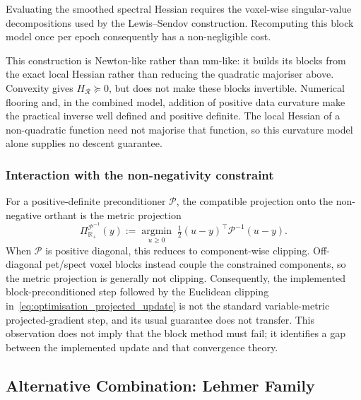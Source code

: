 Evaluating the smoothed spectral Hessian requires the voxel-wise singular-value decompositions used by the Lewis--Sendov construction. Recomputing this block model once per epoch consequently has a non-negligible cost.

This construction is Newton-like rather than \gls{mm}-like: it builds its blocks from the exact local Hessian rather than reducing the quadratic majoriser above. Convexity gives $H_{\mathcal R}\succeq0$, but does not make these blocks invertible. Numerical flooring and, in the combined model, addition of positive data curvature make the practical inverse well defined and positive definite. The local Hessian of a non-quadratic function need not majorise that function, so this curvature model alone supplies no descent guarantee.

\subsubsection{Interaction with the non-negativity constraint}
\label{subsubsec:precond_constraint}

For a positive-definite preconditioner $\mathcal P$, the compatible projection onto the non-negative orthant is the metric projection
\begin{equation*}
    \Pi_{\mathbb{R}_+}^{\mathcal P^{-1}}(y)
    :=
    \underset{u\geq0}{\operatorname{argmin}}\;
    \tfrac12(u-y)^\top\mathcal P^{-1}(u-y).
\end{equation*}
When $\mathcal P$ is positive diagonal, this reduces to component-wise clipping. Off-diagonal \gls{pet}/\gls{spect} voxel blocks instead couple the constrained components, so the metric projection is generally not clipping. Consequently, the implemented block-preconditioned step followed by the Euclidean clipping in~\eqref{eq:optimisation_projected_update} is not the standard variable-metric projected-gradient step, and its usual guarantee does not transfer. This observation does not imply that the block method must fail; it identifies a gap between the implemented update and that convergence theory.

\subsection{Alternative Combination: Lehmer Family}

